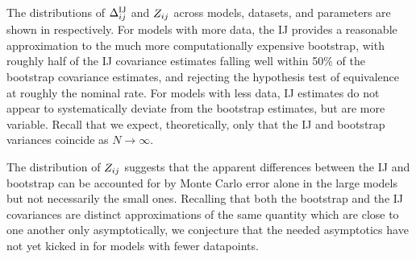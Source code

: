 %
The distributions of $\Delta^{\mathrm{IJ}}_{ij}$ and $Z_{ij}$ across models,
datasets, and parameters are shown in 
respectively.
%
For models with more data, the IJ provides a reasonable approximation to the
much more computationally expensive bootstrap, with roughly half of the IJ
covariance estimates falling well within 50\% of the bootstrap covariance
estimates, and rejecting the hypothesis test of equivalence at roughly the
nominal rate.  For models with less data, IJ estimates do not appear to
systematically deviate from the bootstrap estimates, but are more variable.
Recall that we expect, theoretically, only that the IJ and bootstrap variances
coincide as $N \rightarrow \infty$.

The distribution of $Z_{ij}$ suggests that the apparent differences between
the IJ and bootstrap can be accounted for by Monte Carlo error alone in the
large models but not necessarily the small ones.  Recalling that both the
bootstrap and the IJ covariances are distinct approximations of the same
quantity which are close to one another only asymptotically, we conjecture that
the needed asymptotics have not yet kicked in for models with fewer datapoints.


